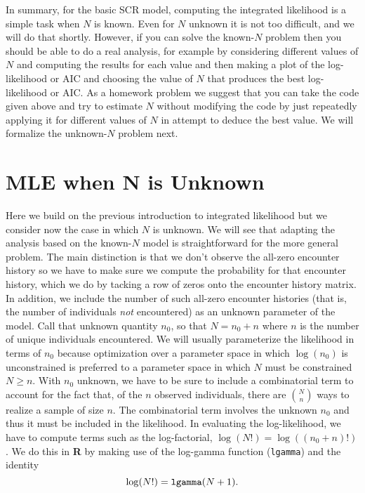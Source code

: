 In summary, for the basic SCR model, computing the integrated
likelihood is a simple task when $N$ is known. Even for $N$
unknown it is not too difficult, and we will do that shortly.
However, if you can solve the known-$N$ problem then you should be able
to do a real analysis, for example by considering different values of
$N$ and computing the results for each value and then making a plot of
the log-likelihood or AIC and choosing the value of $N$ that produces
the best log-likelihood or AIC. As a homework problem we suggest that
you can take the code given above and try to estimate $N$ without
modifying the code by just repeatedly applying it for 
different values of $N$ in attempt to deduce the best value.
We will formalize the unknown-$N$ problem next.


\section{MLE when N is Unknown} 
\label{mle.sec.Nunknown}

Here we build on the previous introduction to integrated likelihood
but we consider now the case in which $N$ is unknown. We will see that
adapting the analysis based on the known-$N$ model is 
straightforward for the more general problem. The main distinction is
that we don't observe the all-zero encounter history so we have to
make sure we compute the probability for that encounter history,  which
we do by tacking a row of zeros onto the encounter history matrix. In
addition, we include the number of such all-zero encounter histories
(that is, the number of individuals {\it not} encountered)
as an unknown parameter of the model. Call that unknown quantity
$n_{0}$, so that $N=n_{0}+n$ where $n$ is the number of unique
individuals encountered. We will usually parameterize the
likelihood in terms of $n_{0}$ because optimization over a parameter
space in which $\log(n_{0})$ is unconstrained is preferred to a
parameter space in which $N$ must be constrained $N\ge n$.
With $n_{0}$ unknown, we have to be sure to include a combinatorial term to
account for the fact that, of the $n$ observed individuals, there are
${N \choose n}$ 
ways to realize a sample of size $n$. The
combinatorial term involves the unknown $n_{0}$ and thus it must be
included in the likelihood. In evaluating the  log-likelihood, we
have to compute terms such as the log-factorial, $\log(N!) = \log((n_{0}+n)!)$. 
We do this in {\bf R} by making use of the log-gamma function
(\mbox{\tt lgamma}) and the identity
\[
 \log(N!) = \mbox{\tt lgamma}(N+1).
\]

